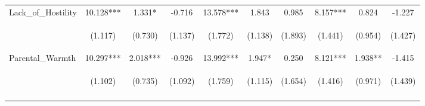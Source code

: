 \begin{tabular}{lccccccccc}
\noalign{\smallskip}Lack\_of\_Hostility & 10.128*** & 1.331* & -0.716 & 13.578*** & 1.843 & 0.985 & 8.157*** & 0.824 & -1.227\\
 & \begin{footnotesize}(1.117)\end{footnotesize} & \begin{footnotesize}(0.730)\end{footnotesize} & \begin{footnotesize}(1.137)\end{footnotesize} & \begin{footnotesize}(1.772)\end{footnotesize} & \begin{footnotesize}(1.138)\end{footnotesize} & \begin{footnotesize}(1.893)\end{footnotesize} & \begin{footnotesize}(1.441)\end{footnotesize} & \begin{footnotesize}(0.954)\end{footnotesize} & \begin{footnotesize}(1.427)\end{footnotesize}\\
\noalign{\smallskip}Parental\_Warmth & 10.297*** & 2.018*** & -0.926 & 13.992*** & 1.947* & 0.250 & 8.121*** & 1.938** & -1.415\\
 & \begin{footnotesize}(1.102)\end{footnotesize} & \begin{footnotesize}(0.735)\end{footnotesize} & \begin{footnotesize}(1.092)\end{footnotesize} & \begin{footnotesize}(1.759)\end{footnotesize} & \begin{footnotesize}(1.115)\end{footnotesize} & \begin{footnotesize}(1.654)\end{footnotesize} & \begin{footnotesize}(1.416)\end{footnotesize} & \begin{footnotesize}(0.971)\end{footnotesize} & \begin{footnotesize}(1.439)\end{footnotesize}\\
\noalign{\smallskip}\hline\end{tabular}\\
